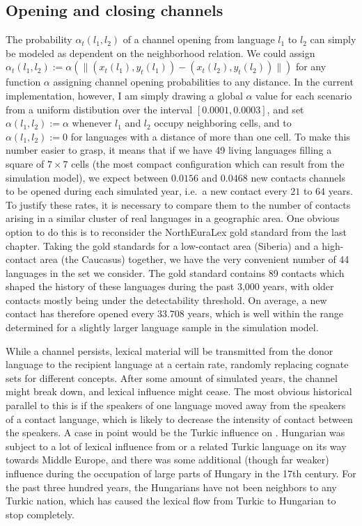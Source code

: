 \subsection{Opening and closing channels}
The probability $\alpha_t(l_1,l_2)$ of a channel opening from language $l_1$ to $l_2$ can simply be modeled as dependent on the neighborhood relation. We could assign $\alpha_t(l_1,l_2) := \alpha(\lVert (x_t(l_1),y_t(l_1)) - (x_t(l_2),y_t(l_2)) \rVert)$ for any function $\alpha$ assigning channel opening probabilities to any distance. In the current implementation, however, I am simply drawing a global $\alpha$ value for each scenario from a uniform distibution over the interval $[0.0001,0.0003]$, and set $\alpha(l_1,l_2) := \alpha$ whenever $l_1$ and $l_2$ occupy neighboring cells, and to $\alpha(l_1,l_2) := 0$ for languages with a distance of more than one cell. To make this number easier to grasp, it means that if we have 49 living languages filling a square of $7 \times 7$ cells (the most compact configuration which can result from the simulation model), we expect between $0.0156$ and $0.0468$ new contacts channels to be opened during each simulated year, i.e.\ a new contact every $21$ to $64$ years. To 
justify these rates, it is necessary to compare them to the number of contacts arising in a similar cluster of real languages in a geographic area. One obvious option to do this is to reconsider the NorthEuraLex gold standard from the last chapter. Taking the gold standards for a low-contact area (Siberia) and a high-contact area (the Caucasus) together, we have the very convenient number of 44 languages in the set we consider. The gold standard contains 89 contacts which shaped the history of these languages during the past 3,000 years, with older contacts mostly being under the detectability threshold. On average, a new contact has therefore opened every $33.708$ years, which is well within the range determined for a slightly larger language sample in the simulation model.

While a channel persists, lexical material will be transmitted from the donor language to the recipient language at a certain rate, randomly replacing cognate sets for different concepts. After some amount of simulated years, the channel might break down, and lexical influence might cease. The most obvious historical parallel to this is if the speakers of one language moved away from the speakers of a contact language, which is likely to decrease the intensity of contact between the speakers. A case in point would be the Turkic influence on . Hungarian was subject to a lot of lexical influence from  or a related Turkic language on its way towards Middle Europe, and there was some additional (though far weaker) influence during the  occupation of large parts of Hungary in the 17th century. For the past three hundred years, the Hungarians have not been neighbors to any Turkic nation, which has caused the lexical flow from Turkic to Hungarian to stop 
completely.

